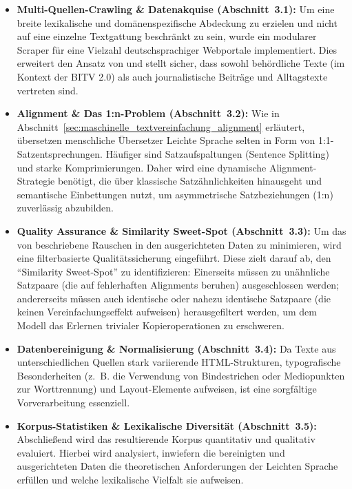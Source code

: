 \begin{itemize}
    \item \textbf{Multi-Quellen-Crawling \& Datenakquise (Abschnitt~3.1):} Um eine breite lexikalische und domänenspezifische Abdeckung zu erzielen und nicht auf eine einzelne Textgattung beschränkt zu sein, wurde ein modularer Scraper für eine Vielzahl deutschsprachiger Webportale implementiert. Dies erweitert den Ansatz von \citet{battisti2020corpus} und stellt sicher, dass sowohl behördliche Texte (im Kontext der BITV 2.0) als auch journalistische Beiträge und Alltagstexte vertreten sind.
    \item \textbf{Alignment \& Das 1:n-Problem (Abschnitt~3.2):} Wie in Abschnitt~\ref{sec:maschinelle_textvereinfachung_alignment} erläutert, übersetzen menschliche Übersetzer Leichte Sprache selten in Form von 1:1-Satzentsprechungen. Häufiger sind Satzaufspaltungen (Sentence Splitting) und starke Komprimierungen. Daher wird eine dynamische Alignment-Strategie benötigt, die über klassische Satzähnlichkeiten hinausgeht und semantische Einbettungen nutzt, um asymmetrische Satzbeziehungen (1:n) zuverlässig abzubilden.
    \item \textbf{Quality Assurance \& Similarity Sweet-Spot (Abschnitt~3.3):} Um das von \citet{stajner2018cats} beschriebene Rauschen in den ausgerichteten Daten zu minimieren, wird eine filterbasierte Qualitätssicherung eingeführt. Diese zielt darauf ab, den "`Similarity Sweet-Spot"' zu identifizieren: Einerseits müssen zu unähnliche Satzpaare (die auf fehlerhaften Alignments beruhen) ausgeschlossen werden; andererseits müssen auch identische oder nahezu identische Satzpaare (die keinen Vereinfachungseffekt aufweisen) herausgefiltert werden, um dem Modell das Erlernen trivialer Kopieroperationen zu erschweren.
    \item \textbf{Datenbereinigung \& Normalisierung (Abschnitt~3.4):} Da Texte aus unterschiedlichen Quellen stark variierende HTML-Strukturen, typografische Besonderheiten (z.~B. die Verwendung von Bindestrichen oder Mediopunkten zur Worttrennung) und Layout-Elemente aufweisen, ist eine sorgfältige Vorverarbeitung essenziell.
    \item \textbf{Korpus-Statistiken \& Lexikalische Diversität (Abschnitt~3.5):} Abschließend wird das resultierende Korpus quantitativ und qualitativ evaluiert. Hierbei wird analysiert, inwiefern die bereinigten und ausgerichteten Daten die theoretischen Anforderungen der Leichten Sprache erfüllen und welche lexikalische Vielfalt sie aufweisen.
\end{itemize}

